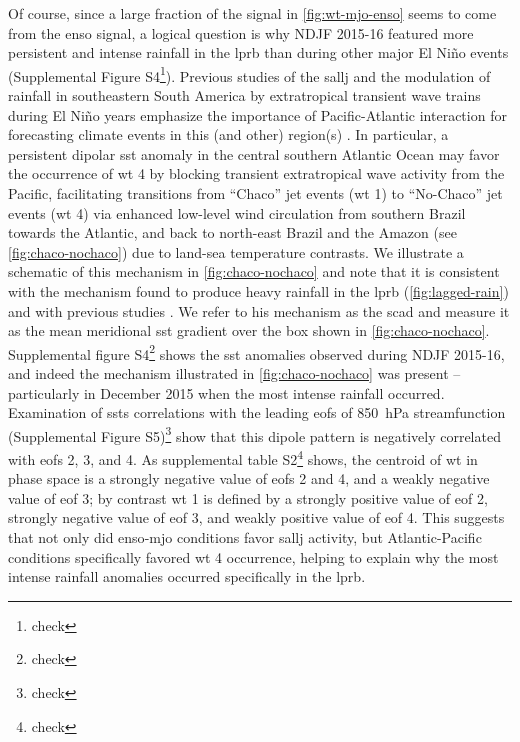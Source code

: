 \documentclass[twocol]{ametsoc}
\begin{document}
Of course, since a large fraction of the signal in \cref{fig:wt-mjo-enso} seems to come from the \gls{enso} signal, a logical question is why NDJF 2015-16 featured more persistent and intense rainfall in the \gls{lprb} than during other major El Ni\~no events (Supplemental Figure S4\footnote{check}).
Previous studies of the \gls{sallj} \citep[e.g.,][]{Vera2006} and the modulation of rainfall in southeastern South America by extratropical transient wave trains during El Ni\~no years emphasize the importance of Pacific-Atlantic interaction for forecasting climate events in this (and other) region(s) \citep{Barreiro2017}.
In particular, a persistent dipolar \gls{sst} anomaly in the central southern Atlantic Ocean may favor the occurrence of \gls{wt} 4 by blocking transient extratropical wave activity from the Pacific, facilitating transitions from ``Chaco'' jet events (\gls{wt} 1) to ``No-Chaco'' jet events (\gls{wt} 4) via enhanced low-level wind circulation from southern Brazil towards the Atlantic, and back to north-east Brazil and the Amazon (see \cref{fig:chaco-nochaco}) due to land-sea temperature contrasts.
We illustrate a schematic of this mechanism in \cref{fig:chaco-nochaco} and note that it is consistent with the mechanism found to produce heavy rainfall in the \gls{lprb} (\cref{fig:lagged-rain}) and with previous studies \citep[e.g.,][]{Vera2006,Salio2002,Liebmann2004}.
We refer to his mechanism as the \gls{scad} and measure it as the mean meridional \gls{sst} gradient over the box shown in \cref{fig:chaco-nochaco}.
Supplemental figure S4\footnote{check} shows the \gls{sst} anomalies observed during NDJF 2015-16, and indeed the mechanism illustrated in \cref{fig:chaco-nochaco} was present -- particularly in December 2015 when the most intense rainfall occurred.
Examination of \glspl{sst} correlations with the leading \glspl{eof} of \SI{850}{\hecto\pascal} streamfunction (Supplemental Figure S5)\footnote{check} show that this dipole pattern is negatively correlated with \glspl{eof} 2, 3, and 4.
As supplemental table S2\footnote{check} shows, the centroid of \gls{wt} in phase space is a strongly negative value of \glspl{eof} 2 and 4, and a weakly negative value of \gls{eof} 3; by contrast \gls{wt} 1 is defined by a strongly positive value of \gls{eof} 2, strongly negative value of \gls{eof} 3, and weakly positive value of \gls{eof} 4.
This suggests that not only did \gls{enso}-\gls{mjo} conditions favor \gls{sallj} activity, but Atlantic-Pacific conditions specifically favored  \gls{wt} 4 occurrence, helping to explain why the most intense rainfall anomalies occurred specifically in the \gls{lprb}.
\end{document}
